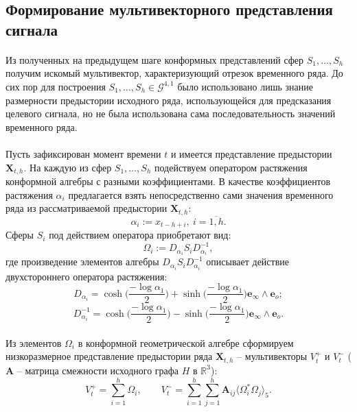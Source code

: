 \documentclass[12pt]{article}
\begin{document}
\begin{comment}
    $$\mathbf{x}_1^{(i)} = \mathbf{a}_i + (r, 0, 0)^{\intercal}$$
    $$\mathbf{x}_2^{(i)} = \mathbf{a}_i + (0, r, 0)^{\intercal}$$
    $$\mathbf{x}_3^{(i)} = \mathbf{a}_i + (0, 0, r)^{\intercal}$$
    $$\mathbf{x}_4^{(i)} = \mathbf{a}_i + (-r, 0, 0)^{\intercal}$$
\end{comment}




\newpage
\subsection{Формирование мультивекторного представления сигнала}
\paragraph{}
Из полученных на предыдущем шаге конформных представлений сфер $S_1, \dots, S_h$ получим искомый мультивектор, характеризующий отрезок временного ряда. До сих пор для построения $S_1, \dots, S_h \in \mathcal{G}^{4,1}$ было использовано лишь знание размерности предыстории исходного ряда, использующейся для предсказания целевого сигнала, но не была использована сама последовательность значений временного ряда.
\paragraph{}
Пусть зафиксирован момент времени $t$ и имеется представление предыстории $\textbf{X}_{t,h}$. На каждую из сфер $S_1, \dots, S_h$ подействуем оператором 
растяжения конформной алгебры с разными коэффициентами. В качестве 
коэффициентов растяжения $\alpha_i$ предлагается взять непосредственно сами
значения временного ряда из рассматриваемой предыстории $\textbf{X}_{t,h}$: 
$$ \alpha_i := x_{t-h+i}, \ i = \overline{1,h}.$$
Сферы $S_i$ под действием оператора приобретают вид:
$$\Omega_i := D_{\alpha_i} S_i D_{\alpha_i}^{-1}, $$
где произведение элементов алгебры $D_{\alpha_i} S_i D_{\alpha_i}^{-1}$ описывает действие двухстороннего оператора растяжения:\\
$$D_{\alpha_i} = \cosh\Bigg(\frac{- \log \alpha_1}{2}\Bigg) + \sinh\Bigg(\frac{- \log \alpha_1}{2}\Bigg) \mathbf{e}_{\infty} \wedge \mathbf{e}_o  ;$$
$$D_{\alpha_i}^{-1} = \cosh\Bigg(\frac{- \log \alpha_1}{2}\Bigg) - \sinh\Bigg(\frac{ - \log \alpha_1}{2}\Bigg) \mathbf{e}_{\infty} \wedge \mathbf{e}_o   .$$

\paragraph{}
Из элементов $\Omega_i$ в конформной геометрической алгебре сформируем низкоразмерное представление предыстории ряда $\textbf{X}_{t,h}$ -- мультивекторы $V^+_t$ и $V^-_t$ ($\textbf{A}$ -- матрица смежности исходного графа $H$ в $\mathds{R}^3$):
$$ V^+_t = \sum_{i = 1}^h \Omega_i, \quad \quad V^-_t = \sum_{i = 1}^h\sum_{j = 1}^h \textbf{A}_{ij}\big\langle \Omega_i^* \Omega_j \big\rangle_5.$$
\end{document}
